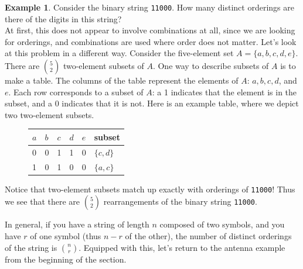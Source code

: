 \documentclass[12pt]{article}
\theoremstyle{definition}
\newtheorem*{example}{Example}
\theoremstyle{remark}
\begin{document}
\begin{example}Consider the binary string \texttt{11000}. How many distinct orderings are there of the digits in this string?\\

At first, this does not appear to involve combinations at all, since we are looking for orderings, and combinations are used where order does not matter. Let's look at this problem in a different way. Consider the five-element set $A = \{a, b, c, d, e\}$. There are $\binom{5}{2}$ two-element subsets of $A$. One way to describe subsets of $A$ is to make a table. The columns of the table represent the elements of $A$: $a, b, c, d$, and $e$. Each row corresponds to a subset of $A$: a 1 indicates that the element is in the subset, and a 0 indicates that it is not. Here is an example table, where we depict two two-element subsets.

\begin{figure}[H]
\centering
\label{twoelementsubsets}
\begin{tabular}{lllll|l}
$a$ & $b$ & $c$ & $d$ & $e$ & subset \\
\hline
0 & 0 & 1 & 1 & 0 & $\{c, d\}$\\
1 & 0 & 1 & 0 & 0 & $\{a, c\}$\\
\end{tabular}
\end{figure}

Notice that two-element subsets match up exactly with orderings of \texttt{11000}! Thus we see that there are $\binom{5}{2}$ rearrangements of the binary string \texttt{11000}.
\end{example}

In general, if you have a string of length $n$ composed of two symbols, and you have $r$ of one symbol (thus $n-r$ of the other), the number of distinct orderings of the string is $\binom{n}{r}$. Equipped with this, let's return to the antenna example from the beginning of the section.
\end{document}
